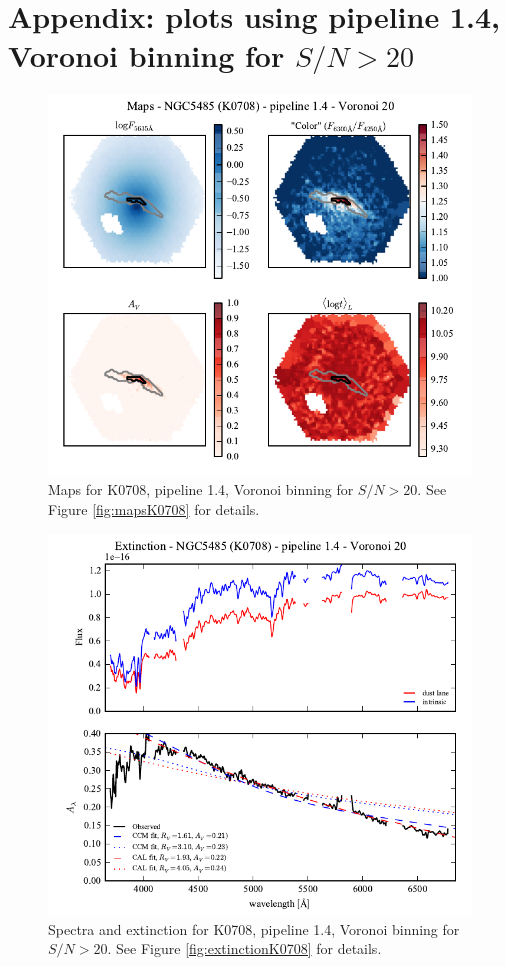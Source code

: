 \documentclass[a4paper]{article}
\begin{document}
\section{Appendix: plots using pipeline 1.4, Voronoi binning for $S/N > 20$}
\label{sec:app14}

\begin{figure}[H]
\includegraphics{figures/maps_K0708_1.4_v20.pdf}
\caption{Maps for K0708, pipeline 1.4, Voronoi binning for $S/N > 20$. See
Figure \ref{fig:mapsK0708} for details.}
\label{fig:maps_K0708_14_v20}
\end{figure}

\begin{figure}[H]
\includegraphics{figures/spectra_K0708_1.4_v20.pdf}
\caption{Spectra and extinction for K0708, pipeline 1.4, Voronoi binning for
$S/N > 20$. See Figure \ref{fig:extinctionK0708} for details.}
\end{figure}
\end{document}
